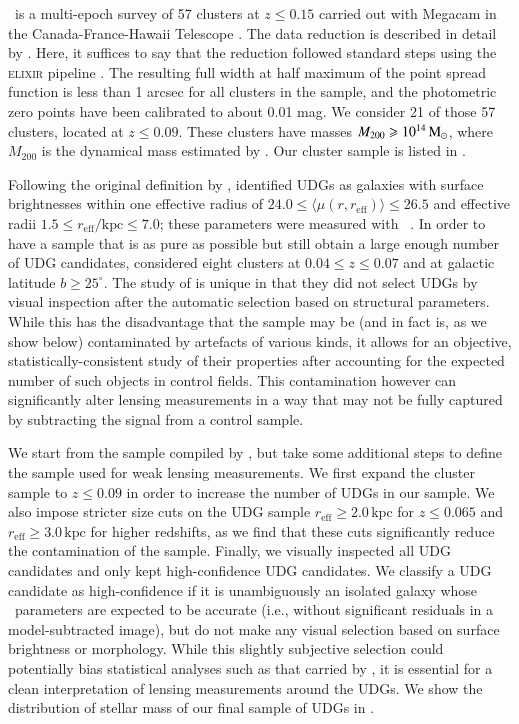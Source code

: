 \documentclass[usenatbib,fleqn]{mnras}
\def\reff{r_\mathrm{eff}}
\begin{document}
\meneacs\ is a multi-epoch survey of 57 clusters at $z\leq0.15$ carried out with Megacam in the Canada-France-Hawaii Telescope \citep{sand12}. The data reduction is described in detail by \cite{vdburg13}. Here, it suffices to say that the reduction followed standard steps using the \textsc{elixir} pipeline \citep{magnier04}. The resulting full width at half maximum of the point spread function is less than 1 arcsec for all clusters in the sample, and the photometric zero points have been calibrated to about 0.01 mag.
%
We consider 21 of those 57 clusters, located at $z\leq0.09$. These clusters have masses $M_{200}\geqslant10^{14}\,\mathrm{M}_\odot$, where $M_{200}$ is the dynamical mass estimated by \cite{sifon15_cccp}. %
Our cluster sample is listed in .

Following the original definition by \cite{vandokkum15}, \cite{vdburg16} identified UDGs as galaxies with surface brightnesses within one effective radius of $24.0\leq \langle\mu(r,\reff)\rangle\leq26.5$ and effective radii $1.5\leq\reff/\mathrm{kpc}\leq7.0$; these parameters were measured with \galfit\ \citep{peng02,peng10}. In order to have a sample that is as pure as possible but still obtain a large enough number of UDG candidates, \cite{vdburg16} considered eight clusters at $0.04\leq z \leq0.07$ and at galactic latitude $b\geq25^\circ$. The study of \cite{vdburg16} is unique in that they did not select UDGs by visual inspection after the automatic selection based on structural parameters. While this has the disadvantage that the sample may be (and in fact is, as we show below) contaminated by artefacts of various kinds, it allows for an objective, statistically-consistent study of their properties after accounting for the expected number of such objects in control fields. This contamination however can significantly alter lensing measurements in a way that may not be fully captured by subtracting the signal from a control sample.

We start from the sample compiled by \cite{vdburg16}, but take some additional steps to define the sample used for weak lensing measurements. We first expand the cluster sample to $z\leq0.09$ in order to increase the number of UDGs in our sample. We also impose stricter size cuts on the UDG sample $\reff\geq2.0\,\mathrm{kpc}$ for $z\leq0.065$ and $\reff\geq3.0\,\mathrm{kpc}$ for higher redshifts, as we find that these cuts significantly reduce the contamination of the sample. Finally, we visually inspected all UDG candidates and only kept high-confidence UDG candidates. We classify a UDG candidate as high-confidence if it is unambiguously an isolated galaxy whose \galfit\ parameters are expected to be accurate (i.e., without significant residuals in a model-subtracted image), but do not make any visual selection based on surface brightness or morphology. While this slightly subjective selection could potentially bias statistical analyses such as that carried by \cite{vdburg16}, it is essential for a clean interpretation of lensing measurements around the UDGs. We show the distribution of stellar mass of our final sample of UDGs in .
\end{document}

